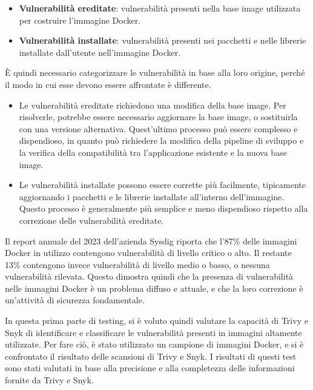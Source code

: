 \begin{itemize}
   \item \textbf{Vulnerabilità ereditate}: vulnerabilità presenti nella base image utilizzata per costruire l'immagine Docker.
   \item \textbf{Vulnerabilità installate}: vulnerabilità presenti nei pacchetti e nelle librerie installate dall'utente nell'immagine Docker.
\end{itemize}
È quindi necessario categorizzare le vulnerabilità in base alla loro origine, perché il modo in cui esse devono essere affrontate è differente.
\begin{itemize}
   \item Le vulnerabilità ereditate richiedono una modifica della base image. Per risolverle, potrebbe essere necessario aggiornare la base image, o sostituirla con una versione alternativa. Quest'ultimo processo può essere complesso e dispendioso, in quanto può richiedere la modifica della pipeline di sviluppo e la verifica della compatibilità tra l'applicazione esistente e la nuova base image.
   \item Le vulnerabilità installate possono essere corrette più facilmente, tipicamente aggiornando i pacchetti e le librerie installate all'interno dell'immagine. Questo processo è generalmente più semplice e meno dispendioso rispetto alla correzione delle vulnerabilità ereditate.
\end{itemize}
Il report annuale del 2023 dell'azienda Sysdig\cite{sysdig_report} riporta che l'87\% delle immagini Docker in utilizzo contengono vulnerabilità di livello critico o alto. Il restante 13\% contengono invece vulnerabilità di livello medio o basso, o nessuna vulnerabilità rilevata. Questo dimostra quindi che la presenza di vulnerabilità nelle immagini Docker è un problema diffuso e attuale, e che la loro correzione è un'attività di sicurezza fondamentale.


In questa prima parte di testing, si è voluto quindi valutare la capacità di Trivy e Snyk di identificare e classificare le vulnerabilità presenti in immagini altamente utilizzate. Per fare ciò, è stato utilizzato un campione di immagini Docker, e si è confrontato il risultato delle scansioni di Trivy e Snyk. I risultati di questi test sono stati valutati in base alla precisione e alla completezza delle informazioni fornite da Trivy e Snyk.

